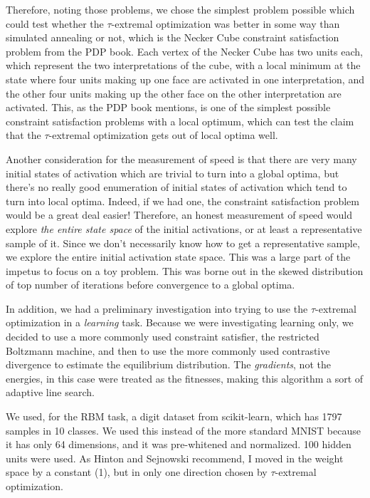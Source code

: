 \documentclass[12pt]{article}
\begin{document}
Therefore, noting those problems, we chose the simplest problem possible which could test whether the $\tau$-extremal optimization was better in some way than simulated annealing or not, which is the Necker Cube constraint satisfaction problem from the PDP book. Each vertex of the Necker Cube has two units each, which represent the two interpretations of the cube, with a local minimum at the state where four units making up one face are activated in one interpretation, and the other four units making up the other face on the other interpretation are activated. This, as the PDP book mentions, is one of the simplest possible constraint satisfaction problems with a local optimum, which can test the claim that the $\tau$-extremal optimization gets out of local optima well.

Another consideration for the measurement of speed is that there are very many initial states of activation which are trivial to turn into a global optima, but there's no really good enumeration of initial states of activation which tend to turn into local optima. Indeed, if we had one, the constraint satisfaction problem would be a great deal easier! Therefore, an honest measurement of speed would explore \emph{the entire state space} of the initial activations, or at least a representative sample of it. Since we don't necessarily know how to get a representative sample, we explore the entire initial activation state space. This was a large part of the impetus to focus on a toy problem. This was borne out in the skewed distribution of top number of iterations before convergence to a global optima.

In addition, we had a preliminary investigation into trying to use the $\tau$-extremal optimization in a \emph{learning} task. Because we were investigating learning only, we decided to use a more commonly used constraint satisfier, the restricted Boltzmann machine, and then to use the more commonly used contrastive divergence to estimate the equilibrium distribution. The \emph{gradients}, not the energies, in this case were treated as the fitnesses, making this algorithm a sort of adaptive line search.

We used, for the RBM task, a digit dataset from scikit-learn, which has 1797 samples in 10 classes. We used this instead of the more standard MNIST because it has only 64 dimensions, and it was pre-whitened and normalized. 100 hidden units were used. As Hinton and Sejnowski recommend, I moved in the weight space by a constant (1), but in only one direction chosen by $\tau$-extremal optimization.
\end{document}
